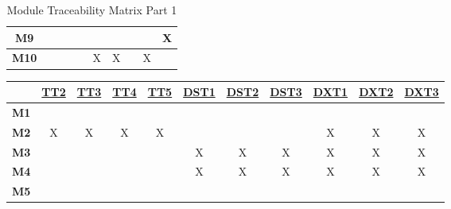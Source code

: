 \documentclass[12pt, titlepage]{article}
\begin{document}
\begin{table}[H]
\begin{tabular}{|c|c|c|c|c|c|c|c|c|c|}
    \textbf{M9}  &                     &                     &                     &                     &                       &                       &                       &                       & X                   \\ \hline
    \textbf{M10} &                     &                     &                     &                     & X                     & X                     &                       & X                     &                     \\ \hline
  \end{tabular}
  \caption{ Module Traceability Matrix Part 1}
  \label{Table:A_Mod_trace}
\end{table}



\begin{table}[H]
  \centering
  \begin{tabular}{|c|c|c|c|c|c|c|c|c|c|c|}
    \hline
                 & \hyperref[TT2]{TT2} & \hyperref[TT3]{TT3} & \hyperref[TT4]{TT4} & \hyperref[TT5]{TT5} & \hyperref[DST1]{DST1} & \hyperref[DST2]{DST2} & \hyperref[DST3]{DST3} & \hyperref[DXT1]{DXT1} & \hyperref[DXT2]{DXT2} & \hyperref[DXT3]{DXT3} \\
    \hline
    \textbf{M1}  &                     &                     &                     &                     &                       &                       &                       &                       &                       &                       \\ \hline
    \textbf{M2}  & X                   & X                   & X                   & X                   &                       &                       &                       & X                     & X                     & X                     \\ \hline
    \textbf{M3}  &                     &                     &                     &                     & X                     & X                     & X                     & X                     & X                     & X                     \\ \hline
    \textbf{M4}  &                     &                     &                     &                     & X                     & X                     & X                     & X                     & X                     & X                     \\ \hline
    \textbf{M5}  &                     &                     &                     &                     &                       &                       &                       &                       &                       &                       \\ \hline

\end{tabular}
\end{table}
\end{document}
